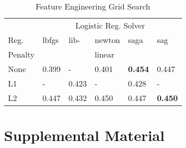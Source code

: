 \documentclass[11pt,a4paper]{article}
\begin{document}


\begin{table}[h]
    \centering
    \caption{Feature Engineering Grid Search}
    \begin{tabular}{
    	l
        l
        l
        l
        l
        l
        }
        \toprule
        \multicolumn{1}{c}{} &
        \multicolumn{5}{c}{Logistic Reg. Solver}\\
        \cmidrule(lr){2-6} 
        {Reg.}& {lbfgs} &{lib-} &{newton}&{saga}& {sag}\\
        {Penalty} & {} && {linear}&&{}\\
        \midrule
        None & 0.399 & - & 0.401 & \textbf{0.454} & 0.447\\
        L1 & - & 0.423 &  -&0.428& -\\
        L2 & 0.447& 0.432& 0.450& 0.447& \textbf{0.450}\\
        \bottomrule
    \end{tabular}
\end{table}








\appendix



\section{Supplemental Material}
\end{document}
